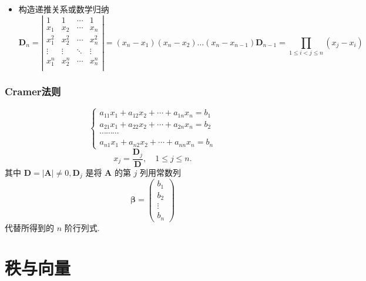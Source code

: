 \documentclass{article}
\begin{document}
\begin{itemize}
$$\begin{array}{cccc}
						1 & c & 0 & 0 \\
					\end{array}\right)
					=0
					$$
					\item 构造递推关系或数学归纳
					$$
					\boldsymbol D_n=\left|\begin{array}{cccc}
						1 & 1 & \cdots & 1 \\
						x_1 & x_2 & \cdots & x_n \\
						x_1^2 & x_2^2 & \cdots & x_n^2 \\
						\vdots & \vdots & \ddots & \vdots \\
						x_1^n & x_2^n & \cdots & x_n^n \\
					\end{array}\right|
					=(x_n-x_1)(x_n-x_2)\dots (x_n-x_{n-1})\boldsymbol D_{n-1}
					=\prod \limits _{1\leqslant i<j\leqslant n}(x_j-x_i)
					$$
				\end{itemize}
			\subsubsection{Cramer法则}
				$$
				\left\{\begin{array}{c}
					a_{11} x_{1}+a_{12} x_{2}+\cdots+a_{1 n} x_{n}=b_{1} \\
					a_{21} x_{1}+a_{22} x_{2}+\cdots+a_{2 n} x_{n}=b_{2} \\
					\cdots \cdots \cdots \\
					a_{n 1} x_{1}+a_{n 2} x_{2}+\cdots+a_{n n} x_{n}=b_{n}
				\end{array}\right.
				$$
				$$
				x_{j}=\frac{\boldsymbol D_{j}}{\boldsymbol D}, \quad 1 \leqslant j \leqslant n .
				$$
				其中 $\boldsymbol D=|\boldsymbol{A}|\neq 0, \boldsymbol D_{j}$ 是将 $\boldsymbol{A}$ 的第 $j$ 列用常数列
				$$
				\boldsymbol{\beta}=\left(\begin{array}{c}
					b_{1} \\
					b_{2} \\
					\vdots \\
					b_{n}
				\end{array}\right)
				$$
				代替所得到的 $n$ 阶行列式.
	\section{秩与向量}
\end{document}
